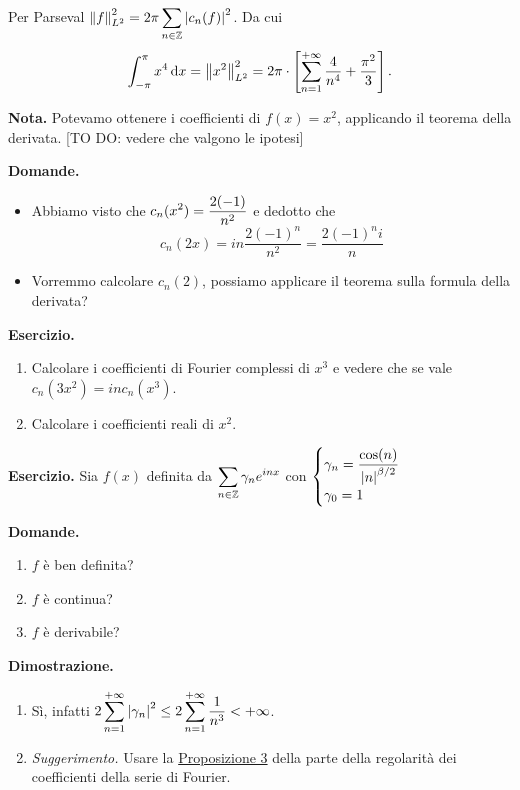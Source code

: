 Per Parseval $\displaystyle \left\lVert f \right\rVert_{L^2}^2 = 2\pi \sum_{n \in \mathbb Z} \left| c_n(f) \right|^2$.
Da cui
%
$$
\int_{-\pi}^\pi x^4 \,\mathrm{d} x = \left\lVert x^2 \right\rVert_{L^2}^2 = 2\pi \cdot \left[ \sum_{n=1}^{+\infty} \frac{4}{n^4} + \frac{\pi^2}{3}  \right].
$$
%

\textbf{Nota.} Potevamo ottenere i coefficienti di $f(x) = x^2$, applicando il teorema della derivata. [TO DO: vedere che valgono le ipotesi]

\textbf{Domande.}
\begin{itemize}

	\item Abbiamo visto che $\displaystyle c_n(x^2) = \frac{2 (-1)}{n^2}$ e dedotto che 
	$$
		c_n(2x) = in \frac{2(-1)^n}{n^2} = \frac{2(-1)^n i}{n}
	$$

	\item Vorremmo calcolare $c_n(2)$, possiamo applicare il teorema sulla formula della derivata?

\end{itemize}

\textbf{Esercizio.}
\begin{enumerate}

	\item Calcolare i coefficienti di Fourier complessi di $x^3$ e vedere che se vale $c_n(3x^2) = i n c_n(x^3)$.


	\item Calcolare i coefficienti reali di $x^2$.

\end{enumerate}

\textbf{Esercizio.} Sia $f(x)$ definita da $\displaystyle \sum_{n \in \mathbb Z} \gamma_n e^{inx} $ con $\ds  %
\begin{cases}
	\ds \gamma_n = \frac{\cos(n)}{\left| n \right|^{\beta / 2}} \\
	\gamma_0 = 1
\end{cases}
$

\textbf{Domande.}
\begin{enumerate}
\item $f$ è ben definita?

\item $f$ è continua?

\item $f$ è derivabile?
\end{enumerate}

\textbf{Dimostrazione.}
\begin{enumerate}

	\item Sì, infatti $\displaystyle 2 \sum_{n=1}^{+\infty} \left| \gamma_n \right|^2 \leq 2 \sum_{n=1}^{+\infty} \frac{1}{n^3} < +\infty $.


	\item \textit{Suggerimento.} Usare la \hyperlink{prop:2021-08nov_prop_3}{Proposizione 3} della parte della regolarità dei coefficienti della serie di Fourier.

\end{enumerate}
